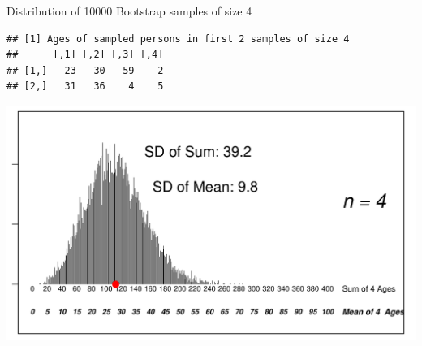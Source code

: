 \documentclass[10pt]{beamer}\usepackage[]{graphicx}\usepackage[]{color}
\makeatletter
\def\maxwidth{ %
  \ifdim\Gin@nat@width>\linewidth
    \linewidth
  \else
    \Gin@nat@width
  \fi
}
\newenvironment{kframe}{%
 \def\at@end@of@kframe{}%
 \ifinner\ifhmode%
  \def\at@end@of@kframe{\end{minipage}}%
  \begin{minipage}{\columnwidth}%
 \fi\fi%
 \def\FrameCommand##1{\hskip\@totalleftmargin \hskip-\fboxsep
 \colorbox{shadecolor}{##1}\hskip-\fboxsep
     \hskip-\linewidth \hskip-\@totalleftmargin \hskip\columnwidth}%
 \MakeFramed {\advance\hsize-\width
   \@totalleftmargin\z@ \linewidth\hsize
   \@setminipage}}%
 {\par\unskip\endMakeFramed%
 \at@end@of@kframe}
\newenvironment{knitrout}{}{} %
\makeatother
\begin{document}
\begin{frame}[fragile]{Distribution of 10000 Bootstrap samples of size 4}
\begin{knitrout}\tiny
{}\color{fgcolor}\begin{kframe}
\begin{verbatim}
## [1] Ages of sampled persons in first 2 samples of size 4
##      [,1] [,2] [,3] [,4]
## [1,]   23   30   59    2
## [2,]   31   36    4    5
\end{verbatim}
\end{kframe}

{\centering \includegraphics[width=\maxwidth]{figure/unnamed-chunk-3-1} 

}



\end{knitrout}
	
\end{frame}
\end{document}
